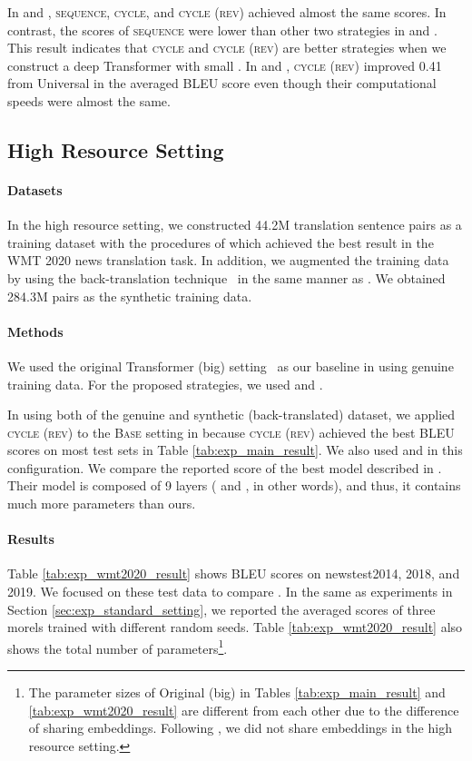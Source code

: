 \documentclass[11pt]{article}
\begin{document}
In  and , \textsc{sequence}, \textsc{cycle}, and \textsc{cycle (rev)} achieved almost the same scores.
In contrast, the scores of \textsc{sequence} were lower than other two strategies in  and .
This result indicates that \textsc{cycle} and \textsc{cycle (rev)} are better strategies when we construct a deep Transformer  with small .
In  and , \textsc{cycle (rev)} improved 0.41 from Universal in the averaged BLEU score even though their computational speeds were almost the same.


\subsection{High Resource Setting}
\label{sec:exp_high_resource}

\paragraph{Datasets}
In the high resource setting, we constructed 44.2M translation sentence pairs as a training dataset with the procedures of  which achieved the best result in the WMT 2020 news translation task.
In addition, we augmented the training data by using the back-translation technique~\cite{sennrich:2016:backtrans} in the same manner as .
We obtained 284.3M pairs as the synthetic training data.


\paragraph{Methods}
We used the original Transformer (big) setting~\cite{NIPS2017_7181} as our baseline in using genuine training data.
For the proposed strategies, we used  and .

In using both of the genuine and synthetic (back-translated) dataset, we applied \textsc{cycle (rev)} to the \textsc{Base} setting in  because \textsc{cycle (rev)} achieved the best BLEU scores on most test sets in Table \ref{tab:exp_main_result}.
We also used  and  in this configuration.
We compare the reported score of the best model described in .
Their model is composed of 9 layers ( and , in other words), and thus, it contains much more parameters than ours.


\paragraph{Results}
Table \ref{tab:exp_wmt2020_result} shows BLEU scores on newstest2014, 2018, and 2019.
We focused on these test data to compare .
In the same as experiments in Section \ref{sec:exp_standard_setting}, we reported the averaged scores of three morels trained with different random seeds.
Table \ref{tab:exp_wmt2020_result} also shows the total number of parameters\footnote{The parameter sizes of Original (big) in Tables \ref{tab:exp_main_result} and \ref{tab:exp_wmt2020_result} are different from each other due to the difference of sharing embeddings. Following , we did not share embeddings in the high resource setting.}.
\end{document}
